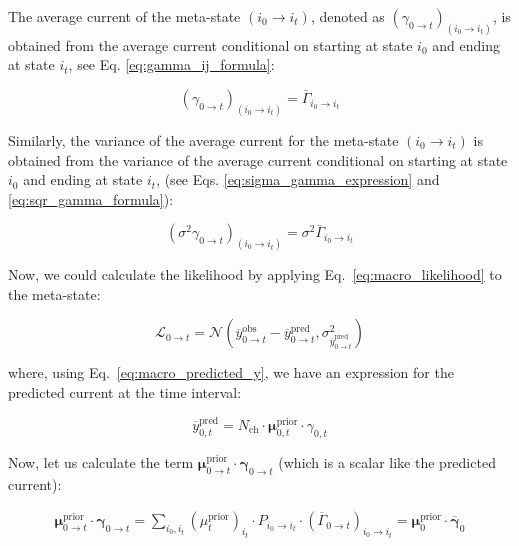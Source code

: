 \documentclass[pdflatex,sn-mathphys-num]{sn-jnl}%
\theoremstyle{thmstyleone}%
\theoremstyle{thmstyletwo}%
\theoremstyle{thmstylethree}%
\begin{document}
The average current of the meta-state \( (i_0 \rightarrow i_t) \), denoted as \( ({\gamma}_{0 \rightarrow t})_{(i_0 \rightarrow i_t)} \), is obtained from the average current conditional on starting at state \( i_0 \) and ending at state \( i_t \), see Eq. \ref{eq:gamma_ij_formula}:

\begin{equation}
	({\gamma}_{0 \rightarrow t})_{(i_0 \rightarrow i_t)} = \overline{\Gamma}_{i_0 \rightarrow i_t}
	\label{eq:meta_gamma_prior}
\end{equation}

Similarly, the variance of the average current for the meta-state \( (i_0 \rightarrow i_t) \) is obtained from the variance of the average current conditional on starting at state $i_0$ and ending at state $i_t$, (see Eqs. \ref{eq:sigma_gamma_expression} and \ref{eq:sqr_gamma_formula}):

\begin{equation}
	(\sigma^2{\gamma}_{0 \rightarrow t})_{(i_0 \rightarrow i_t)} = \sigma^2 \overline{\Gamma}_{i_0 \rightarrow i_t}
	\label{eq:meta_sigma_gamma_prior}
\end{equation}

Now, we could calculate the likelihood by applying Eq.~\ref{eq:macro_likelihood} to the meta-state:

\begin{equation}
	\mathcal{L}_{0 \rightarrow t} = \mathcal{N}(\overline{y}^{\text{obs}}_{0 \rightarrow t} - \overline{y}^{\text{pred}}_{0 \rightarrow t}, \sigma^2_{\overline{y}^{\text{pred}}_{0 \rightarrow t}})
	\label{eq:meta_macro_likelihood}
\end{equation}

where, using Eq.~\ref{eq:macro_predicted_y}, we have an expression for the predicted current at the time interval:

\begin{equation}
	\overline{y}^{\text{pred}}_{0,t} = N_{\text{ch}} \cdot \mathbf{\mu}^{\text{prior}}_{0,t} \cdot \gamma_{0,t}
	\label{eq:meta_macro_predicted_y}
\end{equation}

Now, let us calculate the term \( \mathbf{\mu}^{\text{prior}}_{0 \rightarrow t} \cdot \mathbf{\gamma}_{0 \rightarrow t} \) (which is a scalar like the predicted current):

\begin{multline}
	\mathbf{\mu}^{\text{prior}}_{0 \rightarrow t} \cdot \mathbf{\gamma}_{0 \rightarrow t} =
	\sum_{i_0, i_t} (\mu^{\text{prior}}_{t})_{i_t} \cdot P_{i_0 \rightarrow i_t} \cdot (\overline{\Gamma}_{0 \rightarrow t})_{i_0 \rightarrow i_t}
	= \mathbf{\mu}^{\text{prior}}_{0} \cdot \overline{\mathbf{\gamma}}_{0}
\end{multline}
\end{document}
